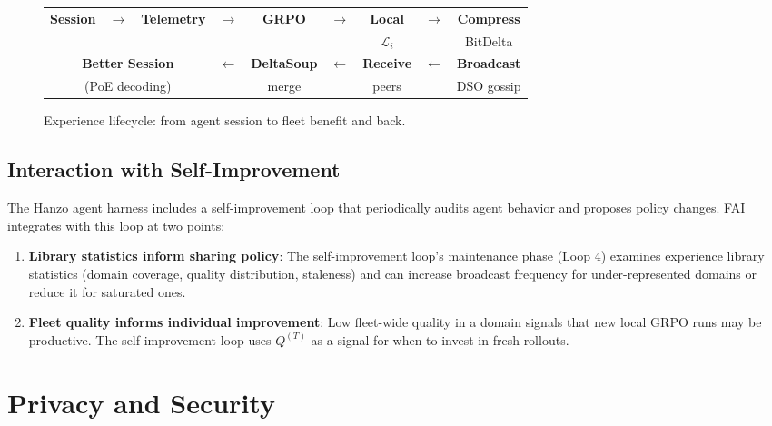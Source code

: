 \documentclass[11pt]{article}
\begin{document}
\begin{figure}[H]
\centering
\small
\setlength{\tabcolsep}{4pt}
\begin{tabular}{ccccccccc}
\textbf{Session} & $\to$ & \textbf{Telemetry} & $\to$ & \textbf{GRPO} & $\to$ & \textbf{Local} & $\to$ & \textbf{Compress} \\
& & & & & & $\mathcal{L}_i$ & & BitDelta \\[4pt]
\multicolumn{3}{c}{\textbf{Better Session}} & $\leftarrow$ & \textbf{DeltaSoup} & $\leftarrow$ & \textbf{Receive} & $\leftarrow$ & \textbf{Broadcast} \\
\multicolumn{3}{c}{(PoE decoding)} & & merge & & peers & & DSO gossip \\
\end{tabular}
\caption{Experience lifecycle: from agent session to fleet benefit and back.}
\label{fig:lifecycle}
\end{figure}

\subsection{Interaction with Self-Improvement}

The Hanzo agent harness includes a self-improvement loop that periodically
audits agent behavior and proposes policy changes. FAI integrates with this
loop at two points:

\begin{enumerate}[leftmargin=1.5em]
    \item \textbf{Library statistics inform sharing policy}: The self-improvement
          loop's maintenance phase (Loop 4) examines experience library statistics
          (domain coverage, quality distribution, staleness) and can increase
          broadcast frequency for under-represented domains or reduce it for
          saturated ones.
    \item \textbf{Fleet quality informs individual improvement}: Low fleet-wide
          quality in a domain signals that new local GRPO runs may be productive.
          The self-improvement loop uses $Q^{(T)}$ as a signal for when to
          invest in fresh rollouts.
\end{enumerate}

\section{Privacy and Security}
\label{sec:privacy}
\end{document}
